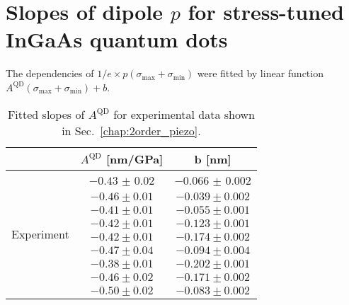 \chapter{Slopes of dipole ${p}$ for stress-tuned InGaAs quantum dots}
\label{app:slopes_of_dipole}
	

	
	The dependencies of $1/e\times p \left( \sigma_\mathrm{max}+\sigma_\mathrm{min} \right)$ were fitted by linear function $ A^{\mathrm{QD}}\left(\sigma_\mathrm{max} + \sigma_\mathrm{min}\right) + b$. %
	
	\begin{table}[ht!]
		\centering
		\caption{Fitted slopes of $A^{\mathrm{QD}}$ for experimental data shown in Sec.~\ref{chap:2order_piezo}.}
		\label{tab:exp_slopes}
		\begin{tabular}{|c|c|c|}
			\hline
			& $A^{\mathrm{QD}}$  [nm/GPa]    & b   [nm]    \\ \hline
			\multirow{9}{*}{Experiment} & $-0.43$ $\pm$ $0.02$  & $-0.066$ $\pm$ $0.002$      \\ \cline{2-3}
			& $-0.46 \pm 0.01$  & $-0.039 \pm 0.002$      \\ \cline{2-3}
			& $-0.41 \pm 0.01$  & $-0.055 \pm 0.001$      \\ \cline{2-3}
			& $-0.42 \pm 0.01$  & $-0.123 \pm 0.001$      \\ \cline{2-3}
			& $-0.42 \pm 0.01$  & $-0.174 \pm 0.002$      \\ \cline{2-3}
			& $-0.47 \pm 0.04$  & $-0.094 \pm 0.004$      \\ \cline{2-3}
			& $-0.38 \pm 0.01$  & $-0.202 \pm 0.001$      \\ \cline{2-3}
			& $-0.46 \pm 0.02$  & $-0.171 \pm 0.002$      \\ \cline{2-3}
			& $-0.50 \pm 0.02$  & $-0.083 \pm 0.002$      \\ \hline
		\end{tabular}    
	\end{table} 
	
